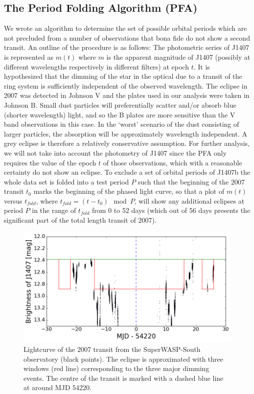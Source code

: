 \documentclass[twocolumn]{aa}
\begin{document}
\subsection{The Period Folding Algorithm (PFA)}
%
We wrote an algorithm to determine the set of possible orbital periods which are not precluded from a number of observations that bona fide do not show a second transit.
%
An outline of the procedure is as follows:
%
The photometric series of J1407 is represented as $m(t)$ where $m$ is the apparent magnitude of J1407 (possibly at different wavelengths respectively in different filters) at epoch $t$.
%
It is hypothesized that the dimming of the star in the optical due to a transit of the ring system is sufficiently independent of the observed wavelength.
%
The eclipse in 2007 was detected in Johnson V and the plates used in our analysis were taken in Johnson B.
%
Small dust particles will preferentially scatter and/or absorb blue (shorter wavelength) light, and so the B plates are more sensitive than the V band observations in this case.
%
In the `worst' scenario of the dust consisting of larger particles, the absorption will be approximately wavelength independent.
%
A grey eclipse is therefore a relatively conservative assumption.
%
For further analysis, we will not take into account the photometry of J1407 since the PFA only requires the value of the epoch $t$ of those observations, which with a reasonable certainty do not show an eclipse.
%
To exclude a set of orbital periods of J1407b the whole data set is folded into a test period $P$ such that the beginning of the 2007 transit $t_0$ marks the beginning of the phased light curve, so that a plot of $m(t)$ versus $t_{fold}$, where $t_{fold} = (t - t_0) \mod P$, will show any additional eclipses at period $P$ in the range of $t_{fold}$ from 0 to 52 days (which out of 56 days presents the significant part of the total length transit of 2007).

\begin{figure}
\centering
\includegraphics[width=\linewidth]{model.png}
\caption{Lightcurve of the 2007 transit from the SuperWASP-South observatory (black points). The eclipse is approximated with three windows (red line) corresponding to the three major dimming events. The centre of the transit is marked with a dashed blue line at around MJD 54220.}
\label{fig_model_lightc}
\end{figure}
\end{document}
